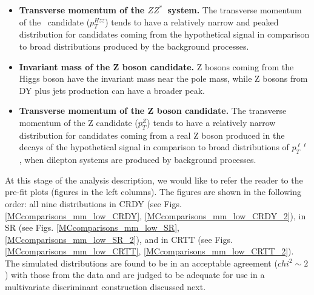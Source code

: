 \begin{itemize}
\item{\bfseries Transverse momentum of the $ZZ^*$~system.} 
The transverse momentum of the \HZZ~candidate ($p_T^{Hzz}$) tends to have a relatively narrow and peaked distribution for candidates coming from the hypothetical signal in comparison to broad distributions produced by the background processes. 

\item{\bfseries Invariant mass of the Z boson candidate.} 
Z bosons coming from the Higgs boson have the invariant mass near the pole mass, while Z bosons from DY plus jets production can have a broader peak.

\item{\bfseries Transverse momentum of the Z boson candidate.} 
The transverse momentum of the Z candidate ($p_T^Z$) tends to have a relatively narrow distribution for candidates coming from a real Z boson produced in the decays of the hypothetical signal in comparison to broad distributions of $p_T^{\ell\ell}$, when dilepton systems are produced by background processes. 

\end{itemize}

At this stage of the analysis description, we would like to refer the reader to the pre-fit plots (figures in the left columns). The figures are shown in the following order: all nine distributions in CRDY (see Figs. \ref{MCcomparisons_mm_low_CRDY}, \ref{MCcomparisons_mm_low_CRDY_2}), in SR (see Figs. \ref{MCcomparisons_mm_low_SR}, \ref{MCcomparisons_mm_low_SR_2}), and in CRTT (see Figs. \ref{MCcomparisons_mm_low_CRTT}, \ref{MCcomparisons_mm_low_CRTT_2}). The simulated distributions are found to be in an acceptable agreement ($chi^2 \sim 2$ ) with those from the data and are judged to be adequate for use in a multivariate discriminant construction discussed next. 

